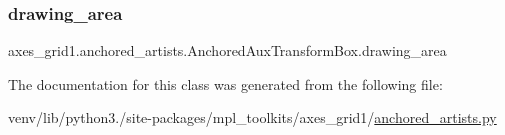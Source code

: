 \subsubsection{\texorpdfstring{drawing\+\_\+area}{drawing\_area}}
{\footnotesize\ttfamily axes\+\_\+grid1.\+anchored\+\_\+artists.\+Anchored\+Aux\+Transform\+Box.\+drawing\+\_\+area}



The documentation for this class was generated from the following file\+:\begin{DoxyCompactItemize}
\item 
venv/lib/python3./site-\/packages/mpl\+\_\+toolkits/axes\+\_\+grid1/\hyperlink{_2anchored__artists_8py}{anchored\+\_\+artists.\+py}\end{DoxyCompactItemize}
